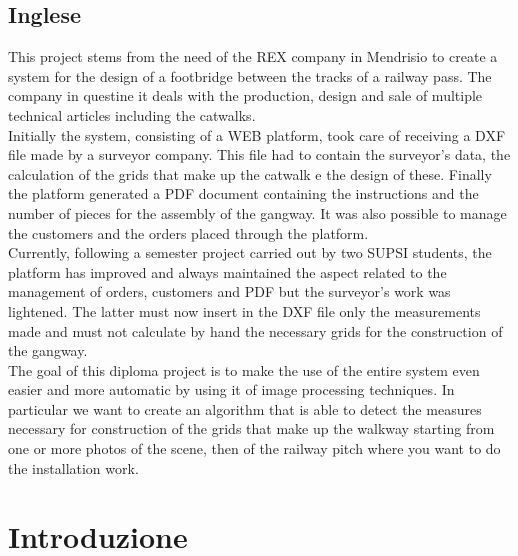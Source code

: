 \documentclass[twoside]{supsistudent}
\begin{document}
\section{Inglese}
This project stems from the need of the REX company in Mendrisio to create a system
for the design of a footbridge between the tracks of a railway pass. The company
in questine it deals with the production, design and sale of multiple
technical articles including the catwalks. \\

Initially the system, consisting of a WEB platform, took care of receiving a DXF file made by a surveyor
company. This file had to contain the surveyor's data, the calculation of the grids that make up the catwalk e
the design of these. Finally the platform generated a PDF document containing the instructions and the number of pieces for the assembly of the gangway.
It was also possible to manage the customers and the orders placed through the platform. \\

Currently, following a semester project carried out by two SUPSI students, the platform has improved and always maintained
the aspect related to the management of orders, customers and PDF but the surveyor's work was lightened. The latter must now insert
in the DXF file only the measurements made and must not calculate by hand the necessary grids for the construction of the gangway. \\

The goal of this diploma project is to make the use of the entire system even easier and more automatic by using it
of image processing techniques. In particular we want to create an algorithm that is able to detect the measures necessary for construction
of the grids that make up the walkway starting from one or more photos of the scene, then of the railway pitch where you want to do the installation work. \\
\chapter{Introduzione}
\end{document}
